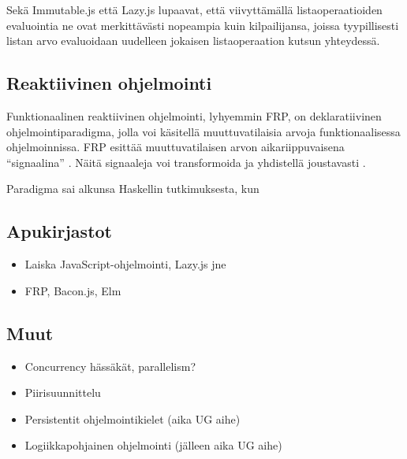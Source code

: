 Sekä Immutable.js että Lazy.js lupaavat, että viivyttämällä listaoperaatioiden evaluointia ne ovat merkittävästi nopeampia kuin kilpailijansa, joissa tyypillisesti listan arvo evaluoidaan uudelleen jokaisen listaoperaation kutsun yhteydessä.

\subsection{Reaktiivinen ohjelmointi}

Funktionaalinen reaktiivinen ohjelmointi, lyhyemmin FRP, on deklaratiivinen ohjelmointiparadigma, jolla voi käsitellä muuttuvatilaisia arvoja funktionaalisessa ohjelmoinnissa. FRP esittää muuttuvatilaisen arvon aikariippuvaisena ``signaalina'' . Näitä signaaleja voi transformoida ja yhdistellä joustavasti \citep{czaplicki2012elm}.

Paradigma sai alkunsa Haskellin tutkimuksesta, kun \citep{m} 

 \citep{czaplicki2012elm}

\subsection{Apukirjastot}
\begin{itemize}
  \item{Laiska JavaScript-ohjelmointi, Lazy.js jne}
  \item{FRP, Bacon.js, Elm \citep{czaplicki2012elm}}
\end{itemize}
\subsection{Muut}
\begin{itemize}
  \item{Concurrency hässäkät, parallelism?}
  \item{Piirisuunnittelu \citep{charlton1991lazy}}
  \item{Persistentit ohjelmointikielet (aika UG aihe) \citep{wevers2014persistent}}
  \item{Logiikkapohjainen ohjelmointi (jälleen aika UG aihe) \citep{alpuente1997specialization}}
\end{itemize}




